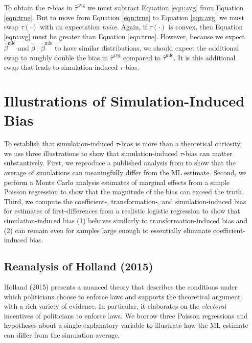 \documentclass[11pt]{article}
\begin{document}
To obtain the $\tau$-bias in $\hat{\tau}^\text{avg}$ we must subtract Equation \ref{eqn:avg} from Equation \ref{eqn:true}.
But to move from Equation \ref{eqn:true} to Equation \ref{eqn:avg} we must swap $\tau(\cdot)$ with an expectation \emph{twice}.
Again, if $\tau(\cdot)$ is convex, then Equation \ref{eqn:avg} must be greater than Equation \ref{eqn:true}.
However, because we expect $\hat{\beta}^\text{mle}$ and $\tilde{\beta} \mid \hat{\beta}^\text{mle}$ to have similar distributions, we should expect the additional swap to roughly double the bias in $\hat{\tau}^\text{avg}$ compared to $\hat{\tau}^\text{mle}$. It is this additional swap that leads to simulation-induced $\tau$-bias.

\section*{Illustrations of Simulation-Induced Bias}

To establish that simulation-induced $\tau$-bias is more than a theoretical curiosity, we use three illustrations to show that simulation-induced $\tau$-bias can matter substantively. First, we reproduce a published analysis from \cite{Holland2015} to show that the average of simulations can meaningfully differ from the ML estimate. Second, we perform a Monte Carlo analysis estimates of marginal effects from a simple Poisson regression to show that the magnitude of the bias can exceed the truth. Third, we compute the coefficient-, transformation-, and simulation-induced bias for estimates of first-differences from a realistic logistic regression to show that simulation-induced bias (1) behaves similarly to transformation-induced bias and (2) can remain even for samples large enough to essentially eliminate coefficient-induced bias.

\subsection*{Reanalysis of Holland (2015)}

Holland (2015) presents a nuanced theory that describes the conditions under which politicians choose to enforce laws and supports the theoretical argument with a rich variety of evidence. In particular, it elaborates on the \textit{electoral} incentives of politicians to enforce laws. We borrow three Poisson regressions and hypotheses about a single explanatory variable to illustrate how the ML estimate can differ from the simulation average.
\end{document}
